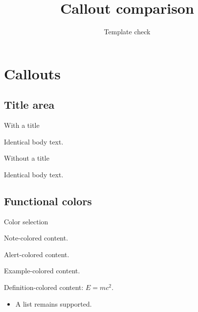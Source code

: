 \documentclass[theme=\boxtesttheme,language=english,cjk=false]{campusbeamer}
\title{Callout comparison}
\author{Template check}
\begin{document}
\section{Callouts}
\subsection{Title area}
\begin{frame}[t]{With a title}
  \begin{tipbox}
    Identical body text.
  \end{tipbox}
\end{frame}
\begin{frame}[t]{Without a title}
  \begin{campusbox}
    Identical body text.
  \end{campusbox}
\end{frame}
\subsection{Functional colors}
\begin{frame}{Color selection}
  \begin{campusbox}[notecolor]Note-colored content.\end{campusbox}
  \begin{campusbox}[alertcolor]Alert-colored content.\end{campusbox}
  \begin{campusbox}[examplecolor]Example-colored content.\end{campusbox}
  \begin{campusbox}[definitioncolor]
    Definition-colored content: $E=mc^2$.
    \begin{itemize}\item A list remains supported.\end{itemize}
  \end{campusbox}
\end{frame}
\end{document}
